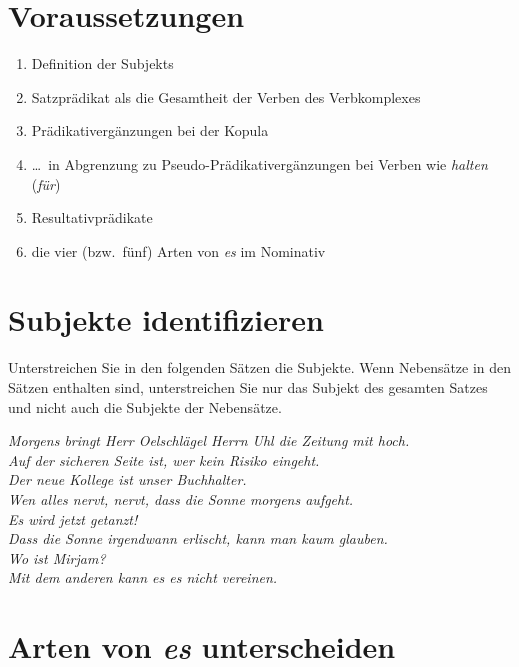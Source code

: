 \section*{Voraussetzungen}

\begin{enumerate}\Lf
  \item Definition der Subjekts
  \item Satzprädikat als die Gesamtheit der Verben des Verbkomplexes
  \item Prädikativergänzungen bei der Kopula
  \item \ldots\ in Abgrenzung zu Pseudo-Prädikativergänzungen bei Verben wie \textit{halten} (\textit{für})
  \item Resultativprädikate
  \item die vier (bzw.\ fünf) Arten von \textit{es} im Nominativ
\end{enumerate}

\section{Subjekte identifizieren}\label{sec:subjekte}

Unterstreichen Sie in den folgenden Sätzen die Subjekte.
Wenn Nebensätze in den Sätzen enthalten sind, unterstreichen Sie nur das Subjekt des gesamten Satzes und nicht auch die Subjekte der Nebensätze.

\begin{exe}
  \ex \textit{Morgens bringt Herr Oelschlägel Herrn Uhl die Zeitung mit hoch.} \\
  \Viertelzeile
  \ex \textit{Auf der sicheren Seite ist, wer kein Risiko eingeht.} \\
  \Viertelzeile
  \ex \textit{Der neue Kollege ist unser Buchhalter.} \\
  \Viertelzeile
  \ex \textit{Wen alles nervt, nervt, dass die Sonne morgens aufgeht.} \\
  \Viertelzeile
  \ex \textit{Es wird jetzt getanzt!} \\
  \Viertelzeile
  \ex \textit{Dass die Sonne irgendwann erlischt, kann man kaum glauben.} \\
  \Viertelzeile
  \ex \textit{Wo ist Mirjam?} \\
  \Viertelzeile
  \ex \textit{Mit dem anderen kann es es nicht vereinen.} \\
  \Viertelzeile
\end{exe}

\section{Arten von \textit{es} unterscheiden}\label{sec:es}

